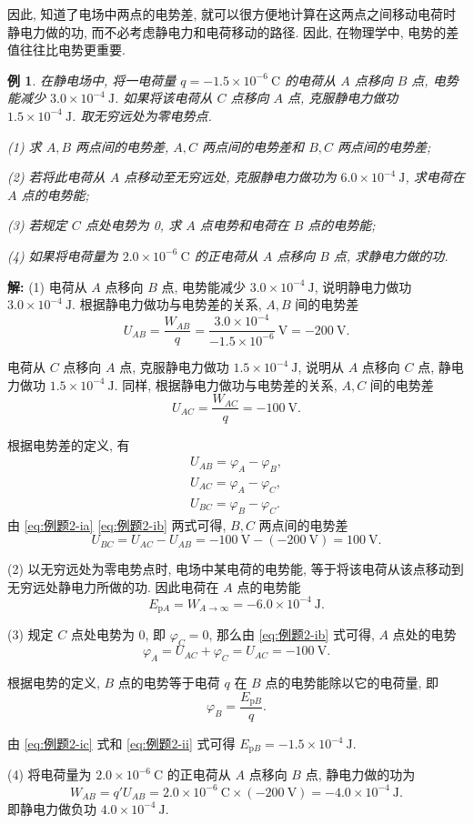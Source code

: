 \documentclass[UTF8,openany,fontset=fandol]{ctexbook}
\theoremstyle{chinesetextbook}
\newtheorem{example}{例}[chapter]
\newenvironment{solution}{\par\indent\textbf{解:} \ignorespaces}{\par}
\newcommand{\unit}[1]{\ \mathrm{#1}}
\begin{document}
因此, 知道了电场中两点的电势差, 就可以很方便地计算在这两点之间移动电荷时静电力做的功, 而不必考虑静电力和电荷移动的路径. 因此, 在物理学中, 电势的差值往往比电势更重要.
\begin{example}\label{ex:电势差的减法}
在静电场中, 将一电荷量 $q=-1.5\times 10^{-6}\unit{C}$ 的电荷从 $A$ 点移向 $B$ 点, 电势能减少 $3.0\times 10^{-4}\unit{J}$. 如果将该电荷从 $C$ 点移向 $A$ 点, 克服静电力做功 $1.5\times 10^{-4}\unit{J}$. 取无穷远处为零电势点.

(1) 求 $A,B$ 两点间的电势差, $A,C$ 两点间的电势差和 $B,C$ 两点间的电势差;

(2) 若将此电荷从 $A$ 点移动至无穷远处, 克服静电力做功为 $6.0\times 10^{-4}\unit{J}$, 求电荷在 $A$ 点的电势能;

(3) 若规定 $C$ 点处电势为 0, 求 $A$ 点电势和电荷在 $B$ 点的电势能;

(4) 如果将电荷量为 $2.0\times 10^{-6}\unit{C}$ 的正电荷从 $A$ 点移向 $B$ 点, 求静电力做的功.
\end{example}
\begin{solution}
(1) 电荷从 $A$ 点移向 $B$ 点, 电势能减少 $3.0\times 10^{-4}\unit{J}$, 说明静电力做功 $3.0\times 10^{-4}\unit{J}$. 根据静电力做功与电势差的关系, $A,B$ 间的电势差
\[
U_{AB}=\frac{W_{AB}}{q}=\frac{3.0\times 10^{-4}}{-1.5\times 10^{-6}}\unit{V}=-200\unit{V}.
\]

电荷从 $C$ 点移向 $A$ 点, 克服静电力做功 $1.5\times 10^{-4}\unit{J}$, 说明从 $A$ 点移向 $C$ 点, 静电力做功 $1.5\times 10^{-4}\unit{J}$. 同样, 根据静电力做功与电势差的关系, $A,C$ 间的电势差
\[
U_{AC}=\frac{W_{AC}}{q}=-100\unit{V}.
\]

根据电势差的定义, 有
\begin{align*}
U_{AB}=\varphi_A-\varphi_B,\tag{i - a}\label{eq:例题2-ia}\\
U_{AC}=\varphi_A-\varphi_C,\tag{i - b}\label{eq:例题2-ib}\\
U_{BC}=\varphi_B-\varphi_C.\tag{i - c}\label{eq:例题2-ic}
\end{align*}
由 \eqref{eq:例题2-ia} \eqref{eq:例题2-ib} 两式可得, $B,C$ 两点间的电势差
\[
U_{BC}=U_{AC}-U_{AB}=-100\unit{V}-(-200\unit{V})=100\unit{V}.
\]

(2) 以无穷远处为零电势点时, 电场中某电荷的电势能, 等于将该电荷从该点移动到无穷远处静电力所做的功. 因此电荷在 $A$ 点的电势能
\[
E_{\mathrm{p}A}=W_{A\rightarrow\infty}=-6.0\times 10^{-4}\unit{J}.
\]

(3) 规定 $C$ 点处电势为 0, 即 $\varphi_C=0$, 那么由 \eqref{eq:例题2-ib} 式可得, $A$ 点处的电势
\[
\varphi_A=U_{AC}+\varphi_C=U_{AC}=-100\unit{V}.
\]

根据电势的定义, $B$ 点的电势等于电荷 $q$ 在 $B$ 点的电势能除以它的电荷量, 即
\[
\varphi_B=\frac{E_{\mathrm{p}B}}{q}. \tag{ii}\label{eq:例题2-ii}
\]

由 \eqref{eq:例题2-ic} 式和 \eqref{eq:例题2-ii} 式可得 $E_{\mathrm{p}B}=-1.5\times 10^{-4}\unit{J}.$

(4) 将电荷量为 $2.0\times 10^{-6}\unit{C}$ 的正电荷从 $A$ 点移向 $B$ 点, 静电力做的功为
\[
W_{AB}=q'U_{AB}=2.0\times 10^{-6}\unit{C}\times (-200\unit{V})=-4.0\times 10^{-4}\unit{J}.
\]
即静电力做负功 $4.0\times 10^{-4}\unit{J}$.
\end{solution}
\end{document}
